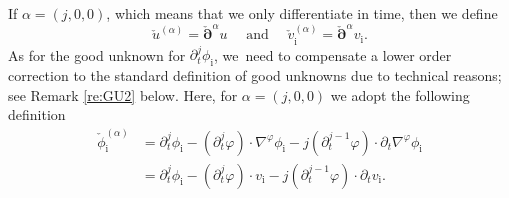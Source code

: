 \documentclass[JEP,XML,SOM,Unicode,NoFloatCountersInSection,published]{cedram}
\newcommand{\dt}{\partial_t}
\newcommand{\cpalpha}{\check{\bm{\partial}}^{\alpha} }
\theoremstyle{definition}
\begin{document}
If $\alpha=(j,0,0)$, which means that we only differentiate in time, then we define
\[
\check{u}^{(\alpha)} = \cpalpha u
\quad\mbox{ and }\quad
\check{v}_\mathrm{i}^{(\alpha)} = \cpalpha v_\mathrm{i}.
\]
As for the good unknown for $\dt^j\phi_\mathrm{i}$, we~need to compensate a lower order correction to the standard definition of good unknowns due to technical reasons; see Remark \ref{re:GU2} below.
Here, for $\alpha=(j,0,0)$ we adopt the following definition
\begin{align*}
\check{\phi}_\mathrm{i}^{(\alpha)}
&= \dt^j \phi_\mathrm{i}-(\dt^j\varphi)\cdot\nabla^\varphi\phi_\mathrm{i}-j(\dt^{j-1}\varphi)\cdot\dt\nabla^\varphi\phi_\mathrm{i} \\
&= \dt^j \phi_\mathrm{i}-(\dt^j\varphi)\cdot v_\mathrm{i}-j(\dt^{j-1}\varphi)\cdot\dt v_\mathrm{i}.
\end{align*}
\end{document}
